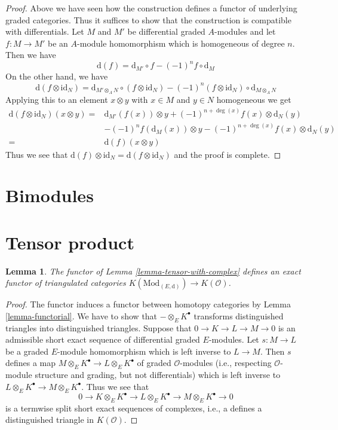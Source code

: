 \documentclass{stacks-project}
\theoremstyle{plain}
\newtheorem{lemma}[subsection]{Lemma}
\theoremstyle{definition}
\theoremstyle{remark}
\numberwithin{equation}{subsection}
\begin{document}
\begin{proof}
Above we have seen how the construction defines a functor of underlying
graded categories. Thus it suffices to show that the construction is
compatible with differentials. Let $M$ and $M'$ be differential
graded $A$-modules and let $f : M \to M'$ be an $A$-module homomorphism
which is homogeneous of degree $n$. Then we have
$$
\text{d}(f) = \text{d}_{M'} \circ f - (-1)^n f \circ \text{d}_M
$$
On the other hand, we have
$$
\text{d}(f \otimes \text{id}_N) =
\text{d}_{M' \otimes_A N} \circ
(f \otimes \text{id}_N)
- (-1)^n
(f \otimes \text{id}_N) \circ \text{d}_{M \otimes_A N}
$$
Applying this to an element $x \otimes y$ with $x \in M$ and
$y \in N$ homogeneous we get
\begin{align*}
\text{d}(f \otimes \text{id}_N)(x \otimes y)
= &
\text{d}_{M'}(f(x)) \otimes y + (-1)^{n + \deg(x)}f(x) \otimes \text{d}_N(y) \\
& - (-1)^n f(\text{d}_M(x)) \otimes y
- (-1)^{n + \deg(x)}f(x) \otimes \text{d}_N(y) \\
= &
\text{d}(f) (x \otimes y)
\end{align*}
Thus we see that $\text{d}(f) \otimes \text{id}_N =
\text{d}(f \otimes \text{id}_N)$ and the proof is complete.
\end{proof}

\section{Bimodules}
\label{section-bimodules}

\section{Tensor product}
\label{section-tensor-product}

\begin{lemma}
\label{lemma-tensor-with-complex-homotopy}
The functor of Lemma \ref{lemma-tensor-with-complex} defines an exact functor
of triangulated categories
$K(\text{Mod}_{(E, \text{d})}) \to K(\mathcal{O})$.
\end{lemma}

\begin{proof}
The functor induces a functor between homotopy categories by
Lemma \ref{lemma-functorial}.
We have to show that $- \otimes_E K^\bullet$ transforms distinguished
triangles into distinguished triangles.
Suppose that $0 \to K \to L \to M \to 0$ is an admissible short
exact sequence of differential graded $E$-modules. Let $s : M \to L$ be
a graded $E$-module homomorphism which is left inverse to $L \to M$.
Then $s$ defines a map $M \otimes_E K^\bullet \to L \otimes_E K^\bullet$
of graded $\mathcal{O}$-modules (i.e., respecting $\mathcal{O}$-module
structure and grading, but not differentials)
which is left inverse to $L \otimes_E K^\bullet \to M \otimes_E K^\bullet$.
Thus we see that
$$
0 \to K \otimes_E K^\bullet \to L \otimes_E K^\bullet \to
M \otimes_E K^\bullet \to 0
$$
is a termwise split short exact sequences of complexes, i.e., a
defines a distinguished triangle in $K(\mathcal{O})$.
\end{proof}
\end{document}
